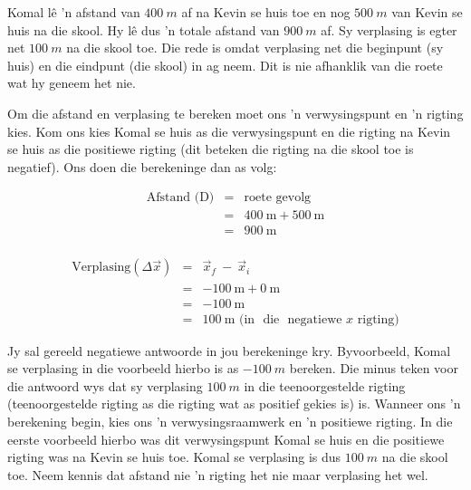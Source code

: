 Komal l\^e 'n afstand van $400~m$ af na Kevin se huis toe en nog $500~m$ van Kevin se huis na die skool. Hy l\^e dus 'n totale afstand van $900~m$ af. Sy verplasing is egter net $100~m$ na die skool toe. Die rede is omdat verplasing net die beginpunt (sy huis) en die eindpunt (die skool) in ag neem. Dit is nie afhanklik van die roete wat hy geneem het nie.

Om die afstand en verplasing te bereken moet ons 'n verwysingspunt en 'n rigting kies. Kom ons kies Komal se huis as die verwysingspunt en die rigting na Kevin se huis as die positiewe rigting (dit beteken die rigting na die skool toe is negatief). Ons doen die berekeninge dan as volg:\par 
\begin{minipage}{0.35\textwidth}
\begin{eqnarray*}
\text{Afstand (D)} &=& \text{roete gevolg}\\
&=&400\ \text{m} + 500\ \text{m}\\
&=&900\ \text{m}\\
\end{eqnarray*}
\end{minipage}
\begin{minipage}{0.65\textwidth}
\begin{eqnarray*}
\text{Verplasing} (\Delta \vec{x}) &=& \vec{x}_f~ - ~ \vec{x}_i\\
&=&-100\ \text{m} + 0\ \text{m}\\
&=&-100\ \text{m}\\
&=&100\ \text{m} \text{ (in ~die~ negatiewe~} x \text{~rigting)}
\end{eqnarray*}
\end{minipage}\par


Jy sal gereeld negatiewe antwoorde in jou berekeninge kry. Byvoorbeeld, Komal se verplasing in die voorbeeld hierbo is as $-100~m$ bereken. Die minus teken voor die ant\-woord wys dat sy verplasing $100~m$ in die teenoorgestelde rigting (teenoorgestelde rigting as die rigting wat as positief gekies is) is. Wanneer ons 'n berekening begin, kies ons 'n verwysingsraamwerk en 'n positiewe rigting. In die eerste voorbeeld hierbo was dit verwysingspunt Komal se huis en die positiewe rigting was na Kevin se huis toe. Komal se verplasing is dus $100~m$ na die skool toe. Neem kennis dat afstand nie 'n rigting het nie maar verplasing het wel.\par


